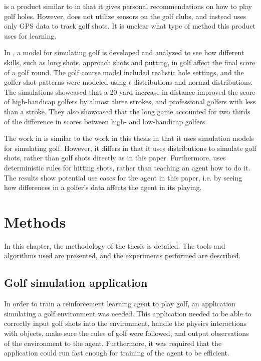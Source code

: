 \documentclass{kththesis}
\begin{document}
\textcite{HelloBir63:online} is a product similar to \textcite{ArccosGo0:online} in that it gives personal recommendations on how to play golf holes. However, \textcite{HelloBir63:online} does not utilize sensors on the golf clubs, and instead uses only GPS data to track golf shots. It is unclear what type of method this product uses for learning.

In \textcite{ko2012simulation}, a model for simulating golf is developed and analyzed to see how different skills, such as long shots, approach shots and putting, in golf affect the final score of a golf round. The golf course model included realistic hole settings, and the golfer shot patterns were modeled using $t$ distributions and normal distributions. The simulations showcased that a 20 yard increase in distance improved the score of high-handicap golfers by almost three strokes, and professional golfers with less than a stroke. They also showcased that the long game accounted for two thirds of the difference in scores between high- and low-handicap golfers.

The work in \textcite{ko2012simulation} is similar to the work in this thesis in that it uses simulation models for simulating golf. However, it differs in that it uses distributions to simulate golf shots, rather than golf shots directly as in this paper. Furthermore, \textcite{ko2012simulation} uses deterministic rules for hitting shots, rather than teaching an agent how to do it. The results show potential use cases for the agent in this paper, i.e. by seeing how differences in a golfer's data affects the agent in its playing.

\chapter{Methods}
\label{chapter:methods}
In this chapter, the methodology of the thesis is detailed. The tools and algorithms used are presented, and the experiments performed are described. 

\section{Golf simulation application}
In order to train a reinforcement learning agent to play golf, an application simulating a golf environment was needed. This application needed to be able to correctly input golf shots into the environment, handle the physics interactions with objects, make sure the rules of golf were followed, and output observations of the environment to the agent. Furthermore, it was required that the application could run fast enough for training of the agent to be efficient.
\end{document}
